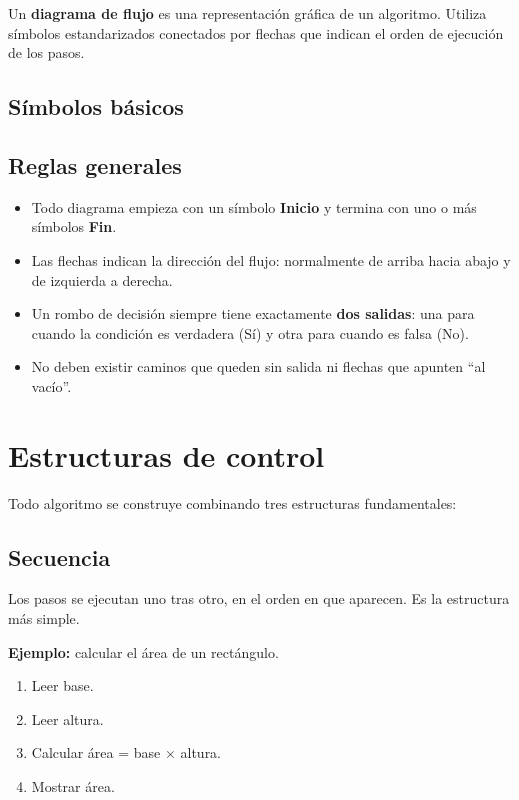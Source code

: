 Un \textbf{diagrama de flujo} es una representación gráfica de un algoritmo. Utiliza símbolos estandarizados conectados por flechas que indican el orden de ejecución de los pasos.

\subsection{Símbolos básicos}


\subsection{Reglas generales}

\begin{itemize}
    \item Todo diagrama empieza con un símbolo \textbf{Inicio} y termina con uno o más símbolos \textbf{Fin}.
    \item Las flechas indican la dirección del flujo: normalmente de arriba hacia abajo y de izquierda a derecha.
    \item Un rombo de decisión siempre tiene exactamente \textbf{dos salidas}: una para cuando la condición es verdadera (Sí) y otra para cuando es falsa (No).
    \item No deben existir caminos que queden sin salida ni flechas que apunten ``al vacío''.
\end{itemize}

\section{Estructuras de control}

Todo algoritmo se construye combinando tres estructuras fundamentales:

\subsection{Secuencia}

Los pasos se ejecutan uno tras otro, en el orden en que aparecen. Es la estructura más simple.


\textbf{Ejemplo:} calcular el área de un rectángulo.
\begin{enumerate}
    \item Leer base.
    \item Leer altura.
    \item Calcular área = base $\times$ altura.
    \item Mostrar área.
\end{enumerate}

